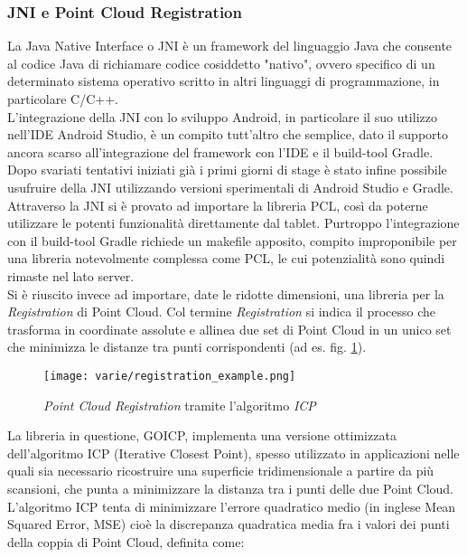 \subsubsection{JNI e Point Cloud Registration}
\label{sec:registration}
La Java Native Interface o JNI è un framework del linguaggio Java che consente al codice Java di richiamare codice cosiddetto "nativo", ovvero specifico di un determinato sistema operativo scritto in altri linguaggi di programmazione, in particolare C/C++.\\
L'integrazione della JNI con lo sviluppo Android, in particolare il suo utilizzo nell'IDE Android Studio, è un compito tutt'altro che semplice, dato il supporto ancora scarso all'integrazione del framework con l'IDE e il build-tool Gradle.\\
Dopo svariati tentativi iniziati già i primi giorni di stage è stato infine possibile usufruire della JNI utilizzando versioni sperimentali di Android Studio e Gradle. \\
Attraverso la JNI si è provato ad importare la libreria PCL, così da poterne utilizzare le potenti funzionalità direttamente dal tablet. Purtroppo l'integrazione con il build-tool Gradle richiede un makefile apposito, compito improponibile per una libreria notevolmente complessa come PCL, le cui potenzialità sono quindi rimaste nel lato server.\\
Si è riuscito invece ad importare, date le ridotte dimensioni, una libreria per la \emph{Registration} di Point Cloud. Col termine \emph{Registration} si indica il processo che trasforma in coordinate assolute e allinea due set di Point Cloud in un unico set che minimizza le distanze tra punti corrispondenti (ad es. fig. \ref{fig:reg_example}).
\begin{figure}[!h] 
    \centering 
    \texttt{[image: varie/registration\_example.png]} 
    \caption{\emph{Point Cloud Registration} tramite l'algoritmo \emph{ICP}}
    \label{fig:reg_example}
\end{figure}
\newline
La libreria in questione, GOICP, implementa una versione ottimizzata dell'algoritmo ICP (Iterative Closest Point), spesso utilizzato in applicazioni nelle quali sia necessario ricostruire una superficie tridimensionale a partire da più scansioni, che punta a minimizzare la distanza tra i punti delle due Point Cloud.\\
L'algoritmo ICP tenta di minimizzare l'errore quadratico medio (in inglese Mean Squared Error, MSE) cioè la discrepanza quadratica media fra i valori dei punti della coppia di Point Cloud, definita come:

